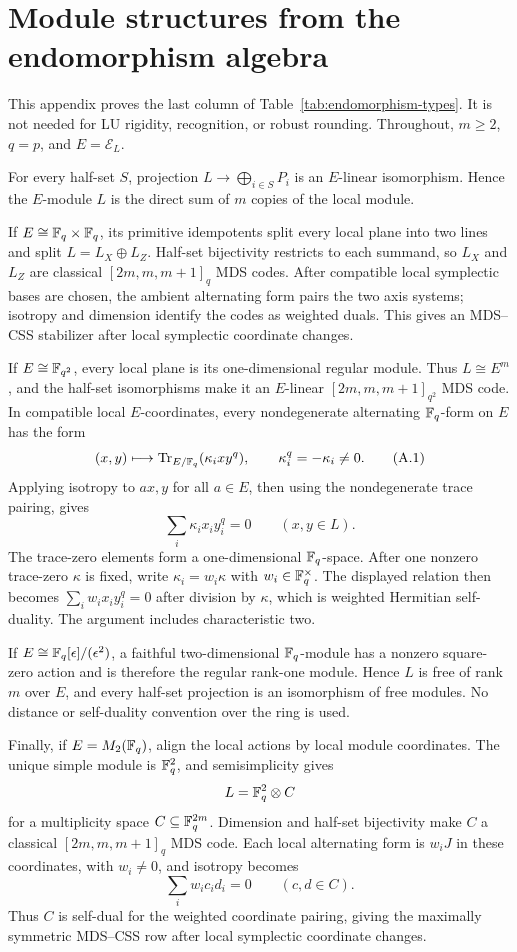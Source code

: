 \section{Module structures from the endomorphism algebra}
\label{app:endomorphism-code-structures}

This appendix proves the last column of
Table~\ref{tab:endomorphism-types}.  It is not needed for LU rigidity,
recognition, or robust rounding.  Throughout, \(m\geq2\), \(q=p\), and
\(E=\mathcal E_L\).

For every half-set \(S\), projection
\(L\to\bigoplus_{i\in S}P_i\) is an \(E\)-linear isomorphism.  Hence the
\(E\)-module \(L\) is the direct sum of \(m\) copies of the local module.

If \(E\cong\mathbb F_q\times\mathbb F_q\), its primitive idempotents split every local
plane into two lines and split \(L=L_X\oplus L_Z\).  Half-set bijectivity
restricts to each summand, so \(L_X\) and \(L_Z\) are classical
\([2m,m,m+1]_q\) MDS codes.  After compatible local symplectic bases are
chosen, the ambient alternating form pairs the two axis systems; isotropy
and dimension identify the codes as weighted duals.  This gives an MDS--CSS
stabilizer after local symplectic coordinate changes.

If \(E\cong\mathbb F_{q^2}\), every local plane is its one-dimensional regular
module.  Thus \(L\cong E^m\), and the half-set isomorphisms make it an
\(E\)-linear \([2m,m,m+1]_{q^2}\) MDS code.  In compatible local
\(E\)-coordinates, every nondegenerate alternating \(\mathbb F_q\)-form on \(E\)
has the form
\[
 (x,y)\longmapsto
 \operatorname{Tr}_{E/\mathbb F_q}(\kappa_i x y^q),
 \qquad \kappa_i^q=-\kappa_i\ne0.                     \tag{A.1}
\]
Applying isotropy to \(ax,y\) for all \(a\in E\), then using the
nondegenerate trace pairing, gives
\[
 \sum_i\kappa_i x_i y_i^q=0\qquad(x,y\in L).
\]
The trace-zero elements form a one-dimensional \(\mathbb F_q\)-space.  After one
nonzero trace-zero \(\kappa\) is fixed, write
\(\kappa_i=w_i\kappa\) with \(w_i\in\mathbb F_q^\times\).  The displayed relation
then becomes \(\sum_iw_i x_i y_i^q=0\) after division by \(\kappa\), which
is weighted Hermitian self-duality.  The argument includes
characteristic two.

If \(E\cong\mathbb F_q[\epsilon]/(\epsilon^2)\), a faithful two-dimensional
\(\mathbb F_q\)-module has a nonzero square-zero action and is therefore the regular
rank-one module.  Hence \(L\) is free of rank \(m\) over \(E\), and every
half-set projection is an isomorphism of free modules.  No distance or
self-duality convention over the ring is used.

Finally, if \(E=M_2(\mathbb F_q)\), align the local actions by local module
coordinates.  The unique simple module is \(\mathbb F_q^2\), and semisimplicity
gives
\[
 L=\mathbb F_q^2\otimes C
\]
for a multiplicity space \(C\subseteq\mathbb F_q^{2m}\).  Dimension and half-set
bijectivity make \(C\) a classical \([2m,m,m+1]_q\) MDS code.  Each local
alternating form is \(w_iJ\) in these coordinates, with \(w_i\ne0\), and
isotropy becomes
\[
 \sum_i w_i c_i d_i=0\qquad(c,d\in C).
\]
Thus \(C\) is self-dual for the weighted coordinate pairing, giving the
maximally symmetric MDS--CSS row after local symplectic coordinate changes.
